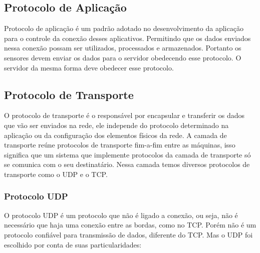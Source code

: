 \documentclass[12pt]{article}
\begin{document}
\subsection{Protocolo de Aplicação}

Protocolo de aplicação é um padrão adotado no desenvolvimento da aplicação para o controle da conexão desses aplicativos. Permitindo que os dados enviados nessa conexão possam ser utilizados, processados e armazenados. Portanto os sensores devem enviar os dados para o servidor obedecendo esse protocolo. O servidor da mesma forma deve obedecer esse protocolo.

\subsection{Protocolo de Transporte}

O protocolo de transporte é o responsável por encapsular e transferir os dados que vão ser enviados na rede, ele independe do protocolo determinado na aplicação ou da configuração dos elementos físicos da rede. A camada de transporte reúne protocolos de transporte fim-a-fim entre as máquinas, isso significa que um sistema que implemente protocolos da camada de transporte só se comunica com o seu destinatário\cite{kurose2005computer}. Nessa camada temos diversos protocolos de transporte como o UDP e o TCP.

\subsubsection{Protocolo UDP}

O protocolo UDP é um protocolo que não é ligado a conexão\cite{kurose2005computer}, ou seja, não é necessário que haja uma conexão entre as bordas, como no TCP. Porém não é um protocolo confiável para transmissão de dados, diferente do TCP. Mas o UDP foi escolhido por conta de suas particularidades:
\end{document}
